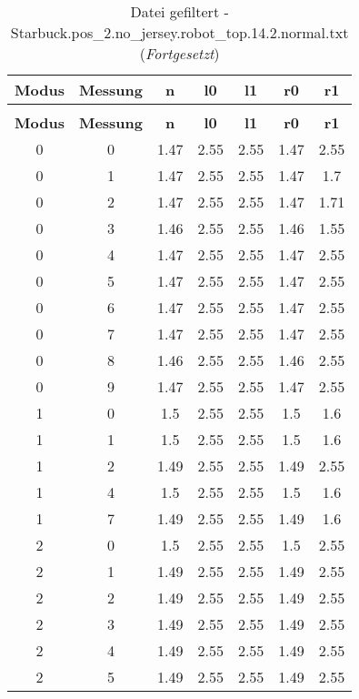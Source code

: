 \begin{longtable}{|c|c||c||c|c||c|c|}
	\caption{Datei gefiltert - Starbuck.pos\_2.no\_jersey.robot\_top.14.2.normal.txt} \label{tab:Starbuck.pos-2.no-jersey.robot-top.14.2.normal.txt} \\ \hline
	\textbf{Modus} & \textbf{Messung} & \textbf{n} & \textbf{l0} & \textbf{l1} & \textbf{r0} & \textbf{r1}\\ \hline
	\endfirsthead
	\caption[]{Datei gefiltert - Starbuck.pos\_2.no\_jersey.robot\_top.14.2.normal.txt (\emph{Fortgesetzt})} \\ \hline
	\textbf{Modus} & \textbf{Messung} & \textbf{n} & \textbf{l0} & \textbf{l1} & \textbf{r0} & \textbf{r1}\\ \hline
	\endhead
	0 & 0 & 1.47 & 2.55 & 2.55 & 1.47 & 2.55 \\ \hline
	0 & 1 & 1.47 & 2.55 & 2.55 & 1.47 & 1.7 \\ \hline
	0 & 2 & 1.47 & 2.55 & 2.55 & 1.47 & 1.71 \\ \hline
	0 & 3 & 1.46 & 2.55 & 2.55 & 1.46 & 1.55 \\ \hline
	0 & 4 & 1.47 & 2.55 & 2.55 & 1.47 & 2.55 \\ \hline
	0 & 5 & 1.47 & 2.55 & 2.55 & 1.47 & 2.55 \\ \hline
	0 & 6 & 1.47 & 2.55 & 2.55 & 1.47 & 2.55 \\ \hline
	0 & 7 & 1.47 & 2.55 & 2.55 & 1.47 & 2.55 \\ \hline
	0 & 8 & 1.46 & 2.55 & 2.55 & 1.46 & 2.55 \\ \hline
	0 & 9 & 1.47 & 2.55 & 2.55 & 1.47 & 2.55 \\ \hline
	1 & 0 & 1.5 & 2.55 & 2.55 & 1.5 & 1.6 \\ \hline
	1 & 1 & 1.5 & 2.55 & 2.55 & 1.5 & 1.6 \\ \hline
	1 & 2 & 1.49 & 2.55 & 2.55 & 1.49 & 2.55 \\ \hline
	1 & 4 & 1.5 & 2.55 & 2.55 & 1.5 & 1.6 \\ \hline
	1 & 7 & 1.49 & 2.55 & 2.55 & 1.49 & 1.6 \\ \hline
	2 & 0 & 1.5 & 2.55 & 2.55 & 1.5 & 2.55 \\ \hline
	2 & 1 & 1.49 & 2.55 & 2.55 & 1.49 & 2.55 \\ \hline
	2 & 2 & 1.49 & 2.55 & 2.55 & 1.49 & 2.55 \\ \hline
	2 & 3 & 1.49 & 2.55 & 2.55 & 1.49 & 2.55 \\ \hline
	2 & 4 & 1.49 & 2.55 & 2.55 & 1.49 & 2.55 \\ \hline
	2 & 5 & 1.49 & 2.55 & 2.55 & 1.49 & 2.55 \\ \hline

\end{longtable}
